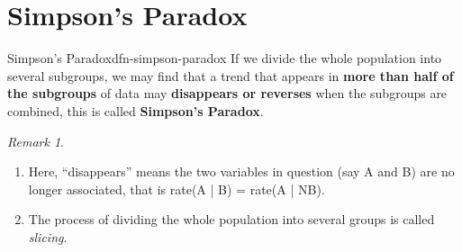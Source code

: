 \documentclass[math,code]{amznotes}
\theoremstyle{remark}
\newtheorem*{remark}{Remark}
\begin{document}
\section{Simpson's Paradox}
\begin{dfnbox}{Simpson's Paradox}{dfn-simpson-paradox}
    If we divide the whole population into several subgroups, we may find that a trend that appears in \textbf{more than half of the subgroups} of data may \textbf{disappears or reverses} when the subgroups are combined, this is called {\color{red} \textbf{Simpson's Paradox}}.
\end{dfnbox}
\begin{notebox}
    \begin{remark}
    \begin{enumerate}
        \item Here, ``disappears'' means the two variables in question (say A and B) are no longer associated, that is rate(A | B) = rate(A | NB).
        \item The process of dividing the whole population into several groups is called \textit{slicing}.
    \end{enumerate}
    \end{remark}
\end{notebox}
\end{document}
